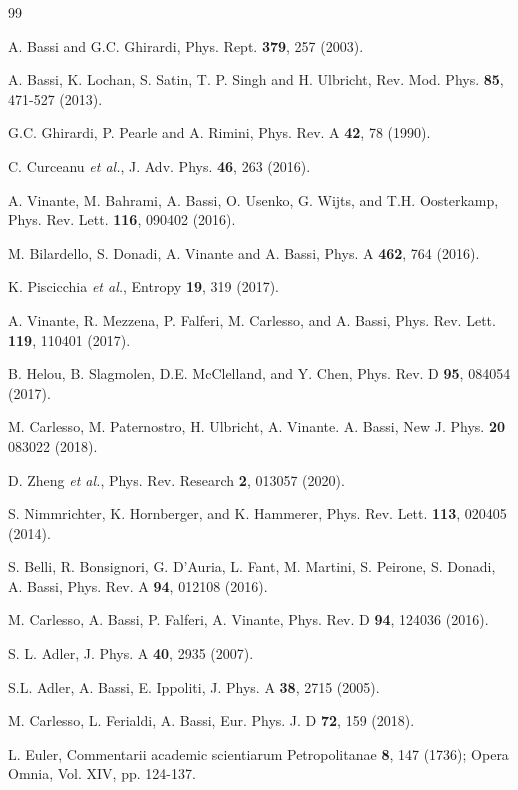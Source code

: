 \documentclass[11pt,onecolumn,amssymb,nofootinbib]{revtex4}
\begin{document}
\begin{thebibliography}{99}

 A. Bassi and G.C. Ghirardi, Phys. Rept. \textbf{379}, 257 (2003).

 A. Bassi, K. Lochan, S. Satin, T. P. Singh and H. Ulbricht, Rev. Mod. Phys. \textbf{85}, 471-527 (2013).

 G.C. Ghirardi, P. Pearle and A. Rimini, Phys. Rev. A {\bf 42}, 78 (1990).

 C. Curceanu {\it et al.}, J. Adv. Phys. {\bf 46}, 263 (2016).

 A. Vinante, M. Bahrami, A. Bassi, O. Usenko, G. Wijts, and T.H. Oosterkamp, Phys. Rev. Lett. {\bf 116}, 090402 (2016).

 M. Bilardello, S. Donadi, A. Vinante and A. Bassi, Phys. A {\bf 462}, 764 (2016).

 K. Piscicchia {\it et al.}, Entropy {\bf19}, 319 (2017).   

 A. Vinante, R. Mezzena, P. Falferi, M. Carlesso, and A. Bassi, Phys. Rev. Lett. {\bf 119}, 110401 (2017).

 B. Helou, B. Slagmolen, D.E. McClelland, and Y. Chen, Phys. Rev. D {\bf 95}, 084054 (2017).

 M. Carlesso, M. Paternostro, H. Ulbricht, A. Vinante. A. Bassi, New J. Phys. {\bf20} 083022 (2018).

 D. Zheng {\it et al.}, Phys. Rev. Research {\bf2}, 013057 (2020).

 S. Nimmrichter, K. Hornberger, and K. Hammerer,
Phys. Rev. Lett. {\bf 113}, 020405 (2014).

 S. Belli, R. Bonsignori, G. D'Auria, L. Fant, M. Martini, S. Peirone, S. Donadi, A. Bassi, Phys. Rev. A {\bf94}, 012108 (2016).

 M. Carlesso, A. Bassi, P. Falferi, A. Vinante, Phys. Rev. D {\bf94}, 124036 (2016).

 S. L. Adler, J. Phys. A {\bf 40}, 2935 (2007).

 S.L. Adler, A. Bassi, E. Ippoliti, J. Phys. A {\bf 38}, 2715 (2005).

 M. Carlesso, L. Ferialdi, A. Bassi,  Eur. Phys. J. D {\bf72}, 159 (2018).

 L. Euler, Commentarii academic scientiarum
Petropolitanae {\bf 8}, 147 (1736); Opera Omnia, Vol. XIV, pp. 124-137.


\end{thebibliography}
\end{document}

